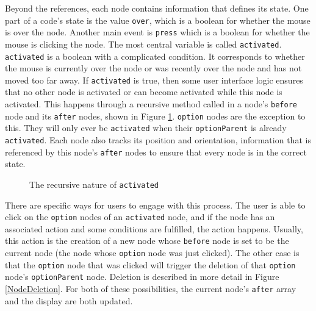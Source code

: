 \documentclass[12pt,twoside]{reedthesis}
\newcommand{\code}[1]{\texttt{#1}}
\begin{document}
	
	
	Beyond the references, each node contains information that defines its state. One part of a code's state is the value \code{over}, which is a boolean for whether the mouse is over the node. Another main event is \code{press} which is a boolean for whether the mouse is clicking the node. The most central variable is called \code{activated}. \code{activated} is a boolean with a complicated condition. It corresponds to whether the mouse is currently over the node or was recently over the node and has not moved too far away. If \code{activated} is true, then some user interface logic ensures that no other node is activated or can become activated while this node is activated. This happens through a recursive method called in a node's \code{before} node and its \code{after} nodes, shown in Figure \ref{Recursion}. \code{option} nodes are the exception to this. They will only ever be \code{activated} when their \code{optionParent} is already \code{activated}. Each node also tracks its position and orientation, information that is referenced by this node's \code{after} nodes to ensure that every node is in the correct state.\\
	
	
	\begin{figure}[h]
	\centering
	\caption{The recursive nature of \code{activated}}
	\label {Recursion}
	\end{figure}
	
	There are specific ways for users to engage with this process. The user is able to click on the \code{option} nodes of an \code{activated} node, and if the node has an associated action and some conditions are fulfilled, the action happens. Usually, this action is the creation of a new node whose \code{before} node is set to be the current node (the node whose \code{option} node was just clicked). The other case is that the \code{option} node that was clicked will trigger the deletion of that \code{option} node's \code{optionParent} node. Deletion is described in more detail in Figure \ref{NodeDeletion}. For both of these possibilities, the current node's \code{after} array and the display are both updated.\\
	
\end{document}

